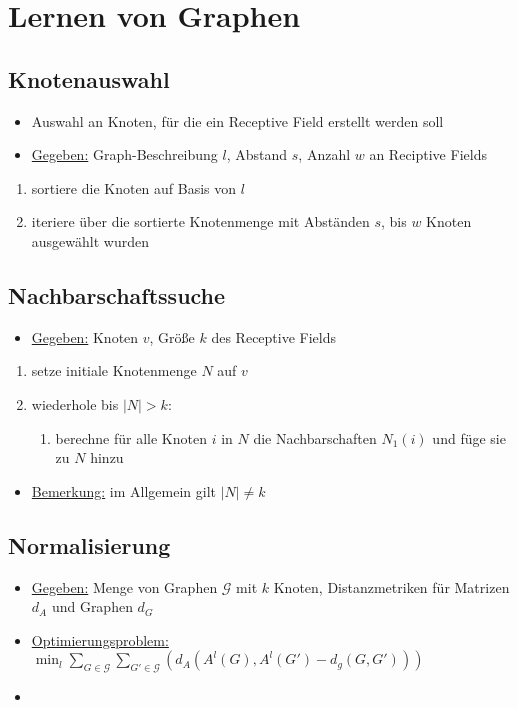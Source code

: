 \section{Lernen von Graphen}

\subsection{Knotenauswahl}

\begin{itemize}
  \item Auswahl an Knoten, für die ein Receptive Field erstellt werden soll
  \item \underline{Gegeben:} Graph-Beschreibung $l$, Abstand $s$, Anzahl $w$ an Reciptive Fields
\end{itemize}

\begin{enumerate}
  \item sortiere die Knoten auf Basis von $l$
  \item iteriere über die sortierte Knotenmenge mit Abständen $s$, bis $w$ Knoten ausgewählt wurden
\end{enumerate}

\subsection{Nachbarschaftssuche}

\begin{itemize}
  \item \underline{Gegeben:} Knoten $v$, Größe $k$ des Receptive Fields
\end{itemize}

\begin{enumerate}
  \item setze initiale Knotenmenge $N$ auf $v$
  \item wiederhole bis $|N| > k$:
    \begin{enumerate}
      \item berechne für alle Knoten $i$ in $N$ die Nachbarschaften $N_1(i)$ und füge sie zu $N$ hinzu
    \end{enumerate}
\end{enumerate}

\begin{itemize}
  \item \underline{Bemerkung:} im Allgemein gilt $|N| \neq k$
\end{itemize}

\subsection{Normalisierung}

\begin{itemize}
  \item \underline{Gegeben:} Menge von Graphen $\mathcal{G}$ mit $k$ Knoten, Distanzmetriken für Matrizen $d_A$ und Graphen $d_G$
  \item \underline{Optimierungsproblem:} $\min_l \sum_{G \in \mathcal{G}} \sum_{G' \in \mathcal{G}} {( d_A(A^l(G), A^l(G') - d_g(G, G')) )}$
  \item {}
\end{itemize}
